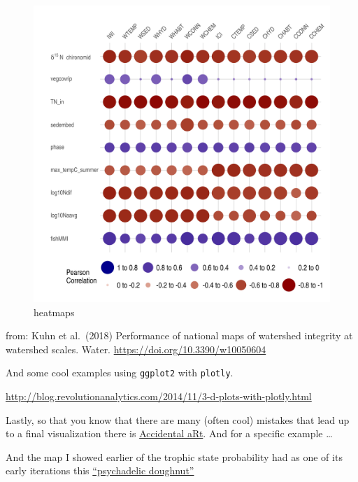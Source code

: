 \documentclass[]{article}
\begin{document}
\begin{figure}
\centering
\includegraphics{figures/water-10-00604-g006.jpg}
\caption{heatmaps}
\end{figure}

from: Kuhn et al.~(2018) Performance of national maps of watershed
integrity at watershed scales. Water.
\url{https://doi.org/10.3390/w10050604}

And some cool examples using \texttt{ggplot2} with \texttt{plotly}.

\url{http://blog.revolutionanalytics.com/2014/11/3-d-plots-with-plotly.html}

Lastly, so that you know that there are many (often cool) mistakes that
lead up to a final visualization there is
\href{http://accidental-art.tumblr.com/}{Accidental aRt}. And for a
specific example \ldots{}

And the map I showed earlier of the trophic state probability had as one
of its early iterations this
\href{http://accidental-art.tumblr.com/post/96720455195/was-trying-to-mess-with-projections-in-ggplot}{``psychadelic
doughnut''}
\end{document}
